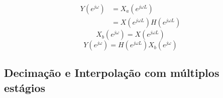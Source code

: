 \begin{frame}[allowframebreaks]
  \begin{align}
   Y(e^{j\omega}) &= X_a (e^{j\omega L})  \\
                  &= X(e^{j\omega L}) H(e^{j\omega L}) 
  \end{align}
  \begin{equation}
   X_b(e^{j\omega}) = X(e^{j\omega L})
  \end{equation}
  \begin{equation}
   Y(e^{j\omega}) = H(e^{j\omega L}) X_b(e^{j\omega})
  \end{equation}

\end{frame}


\subsection{Decimação e Interpolação com múltiplos estágios}
